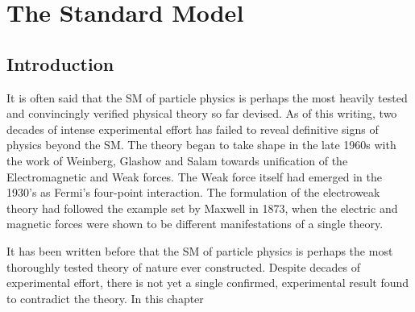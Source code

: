 
\chapter{The Standard Model}
\section{Introduction}
It is often said that the \acl{SM} of particle physics is perhaps the most
heavily tested and convincingly verified physical theory so far devised. As of
this writing, two decades of intense experimental effort has failed to reveal
definitive signs of physics beyond the \ac{SM}. The theory began to take shape
in the late 1960s with the work of Weinberg, Glashow and Salam towards
unification of the Electromagnetic and Weak forces. The Weak force itself had
emerged in the 1930's as Fermi's four-point interaction. The formulation of the
electroweak theory had followed the example set by Maxwell in 1873, when the
electric and magnetic forces were shown to be different manifestations of a
single theory.

It has been written before that the \acl{SM} of particle
physics is perhaps the most thoroughly tested theory of nature ever
constructed. Despite decades of experimental effort, there is not yet a single
confirmed, experimental result found to contradict the theory. In this chapter
